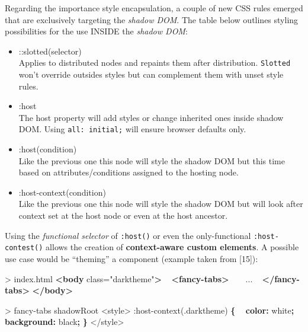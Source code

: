 \documentclass[]{assets/latex/ieee}
\newenvironment{Shaded}{}{}
\newcommand{\KeywordTok}[1]{\textcolor[rgb]{0.00,0.44,0.13}{\textbf{{#1}}}}
\newcommand{\DataTypeTok}[1]{\textcolor[rgb]{0.56,0.13,0.00}{{#1}}}
\newcommand{\DecValTok}[1]{\textcolor[rgb]{0.25,0.63,0.44}{{#1}}}
\newcommand{\FloatTok}[1]{\textcolor[rgb]{0.25,0.63,0.44}{{#1}}}
\newcommand{\StringTok}[1]{\textcolor[rgb]{0.25,0.44,0.63}{{#1}}}
\newcommand{\OtherTok}[1]{\textcolor[rgb]{0.00,0.44,0.13}{{#1}}}
\newcommand{\ErrorTok}[1]{\textcolor[rgb]{1.00,0.00,0.00}{\textbf{{#1}}}}
\newcommand{\NormalTok}[1]{{#1}}
\providecommand{\tightlist}{%
  \setlength{\itemsep}{0pt}\setlength{\parskip}{0pt}}
\begin{document}
Regarding the importance style encapsulation, a couple of new CSS rules
emerged that are exclusively targeting the \emph{shadow DOM}. The table
below outlines styling possibilities for the use INSIDE the \emph{shadow
DOM}:

\begin{itemize}
\tightlist
\item
  ::slotted(selector)\\
  Applies to distributed nodes and repaints them after distribution.
  \texttt{Slotted} won't override outsides styles but can complement
  them with unset style rules.
\item
  :host\\
  The host property will add styles or change inherited ones inside
  shadow DOM. Using \texttt{all:\ initial;} will ensure browser defaults
  only.
\item
  :host(condition)\\
  Like the previous one this node will style the shadow DOM but this
  time based on attributes/conditions assigned to the hosting node.
\item
  :host-context(condition)\\
  Like the previous one this node will style the shadow DOM but will
  look after context set at the host node or even at the host ancestor.
\end{itemize}

Using the \emph{functional selector} of \texttt{:host()} or even the
only-functional \texttt{:host-contest()} allows the creation of
\textbf{context-aware custom elements}. A possible use case would be
``theming'' a component (example taken from {[}15{]}):

\begin{Shaded}
\begin{Highlighting}[]
\NormalTok{> index.html}
\KeywordTok{<body}\OtherTok{ class=}\StringTok{"darktheme"}\KeywordTok{>}
  \KeywordTok{<fancy-tabs>}
    \NormalTok{...}
  \KeywordTok{</fancy-tabs>}
\KeywordTok{</body>}
\end{Highlighting}
\end{Shaded}

\begin{Shaded}
\begin{Highlighting}[]
\NormalTok{> fancy-tabs shadowRoot}
\NormalTok{<style>}
\DecValTok{:}\NormalTok{host-context(}\FloatTok{.darktheme}\NormalTok{) }\KeywordTok{\{}
\ErrorTok{ } \KeywordTok{color:} \DataTypeTok{white}\KeywordTok{;}
\ErrorTok{ } \KeywordTok{background:} \DataTypeTok{black}\KeywordTok{;}
\KeywordTok{\}}
\NormalTok{</style>}
\end{Highlighting}
\end{Shaded}
\end{document}
